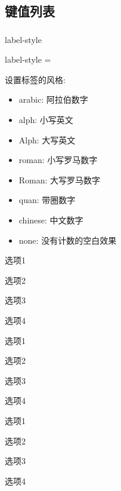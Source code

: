 \documentclass{xdyy-usermanual}
\begin{document}
\subsection{键值列表}\label{subsec:键值列表}


\subsubsection{  }


\begin{function}[updated = 2022-01-11]{label-style}
  \begin{syntax}
    label-style =  
  \end{syntax}
  设置标签的风格: 
  \begin{itemize}
    \item arabic: 阿拉伯数字
    \item alph: 小写英文
    \item Alph: 大写英文
    \item roman: 小写罗马数字
    \item Roman: 大写罗马数字
    \item quan: 带圈数字
    \item chinese: 中文数字
    \item none: 没有计数的空白效果
  \end{itemize}
\end{function}
\begin{vexample}
    \begin{xchoices}[label-style = arabic]
      \item 选项1
      \item 选项2
      \item 选项3
      \item 选项4
    \end{xchoices}
\end{vexample}
\begin{vexample}
    \begin{xchoices}[label-style = alph]
      \item 选项1
      \item 选项2
      \item 选项3
      \item 选项4
    \end{xchoices}
\end{vexample}
\begin{vexample}
    \begin{xchoices}[label-style = Alph]
      \item 选项1
      \item 选项2
      \item 选项3
      \item 选项4
    \end{xchoices}
\end{vexample}
\end{document}
